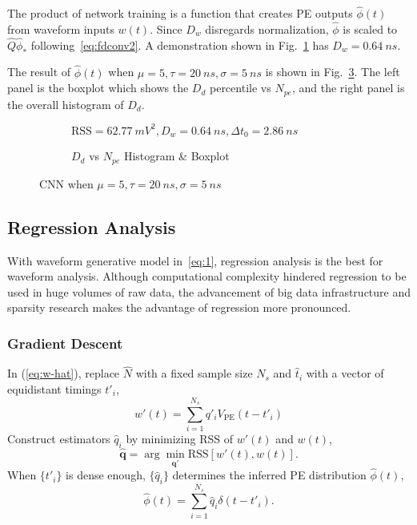 The product of network training is a function that creates PE outputs $\hat{\phi}(t)$ from waveform inputs $w(t)$.  Since $D_w$ disregards normalization, $\hat{\phi}$ is scaled to $\hat{Q}\hat{\phi}_*$ following~\eqref{eq:fdconv2}. A demonstration shown in Fig.~\ref{fig:cnn} has $D_w = \SI{0.64}{ns}$. 

The result of $\hat{\phi}(t)$ when $\mu=5, \tau=\SI{20}{ns}, \sigma=\SI{5}{ns}$ is shown in Fig.~\ref{fig:cnn-npe}. The left panel is the boxplot which shows the $D_d$ percentile vs $N_{pe}$, and the right panel is the overall histogram of $D_d$. 

\begin{figure}[H]
  \begin{subfigure}{.5\textwidth}
    \centering
    \resizebox{\textwidth}{!}{}
    \caption{\label{fig:cnn}$\mathrm{RSS}=\SI{62.77}{mV^2},D_w=\SI{0.64}{ns},\Delta{t_0}=\SI{2.86}{ns}$}
  \end{subfigure}
  \begin{subfigure}{.5\textwidth}
    \centering
    \resizebox{\textwidth}{!}{}
    \caption{\label{fig:cnn-npe} $D_d$ vs $N_{pe}$ Histogram \& Boxplot}
  \end{subfigure}
  \caption{CNN when $\mu=5, \tau=\SI{20}{ns}, \sigma=\SI{5}{ns}$}
\end{figure}

\subsection{Regression Analysis}
With waveform generative model in~\eqref{eq:1}, regression analysis is the best for waveform analysis.  Although computational complexity hindered regression to be used in huge volumes of raw data, the advancement of big data infrastructure and sparsity research makes the advantage of regression more pronounced.

\subsubsection{Gradient Descent}
In (\ref{eq:w-hat}), replace $\hat{N}$ with a fixed sample size $N_s$ and $\hat{t}_i$ with a vector of equidistant timings $t'_i$,
\begin{equation}
  \label{eq:gd}
  w'(t) = \sum_{i=1}^{N_s}q'_iV_\mathrm{PE}(t-t'_i)
\end{equation}
Construct estimators $\hat{q}_i$ by minimizing RSS of $w'(t)$ and $w(t)$,
\begin{equation}
  \label{eq:gd-q}
  \bm{\hat{q}} = \arg \underset{\bm{q'}}{\min} \mathrm{RSS}\left[w'(t),w(t)\right].
\end{equation}
When $\{t'_i\}$ is dense enough, $\{\hat{q}_i\}$ determines the inferred PE distribution $\hat{\phi}(t)$,
\begin{equation}
  \label{eq:gd-phi}
  \hat{\phi}(t) = \sum_{i=1}^{N_s}\hat{q}_i\delta(t-t'_i).
\end{equation}

